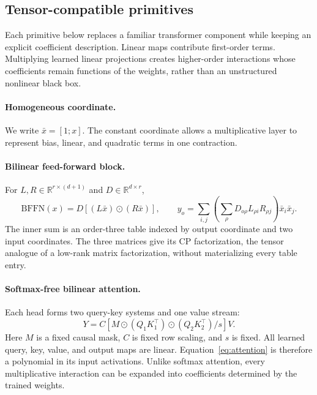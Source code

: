 \documentclass{article}
\newcommand{\R}{\mathbb{R}}
\begin{document}
\subsection{Tensor-compatible primitives}

Each primitive below replaces a familiar transformer component while keeping an explicit
coefficient description. Linear maps contribute first-order terms. Multiplying learned linear
projections creates higher-order interactions whose coefficients remain functions of the
weights, rather than an unstructured nonlinear black box.

\paragraph{Homogeneous coordinate.}
We write $\bar x=[1;x]$. The constant coordinate allows a multiplicative layer to represent
bias, linear, and quadratic terms in one contraction.

\paragraph{Bilinear feed-forward block.}
For $L,R\in\R^{r\times(d+1)}$ and $D\in\R^{d\times r}$,
\begin{equation}
\mathrm{BFFN}(x)
=D\left[(L\bar x)\odot(R\bar x)\right],
\qquad
y_o=\sum_{i,j}\left(\sum_{\rho}D_{o\rho}L_{\rho i}R_{\rho j}\right)\bar x_i\bar x_j .
\label{eq:bffn}
\end{equation}
The inner sum is an order-three table indexed by output coordinate and two input coordinates.
The three matrices give its CP factorization, the tensor analogue of a low-rank matrix
factorization, without materializing every table entry.

\paragraph{Softmax-free bilinear attention.}
Each head forms two query-key systems and one value stream:
\begin{equation}
Y=C\left[M\odot(Q_1K_1^\top)\odot(Q_2K_2^\top)/s\right]V .
\label{eq:attention}
\end{equation}
Here $M$ is a fixed causal mask, $C$ is fixed row scaling, and $s$ is fixed. All learned
query, key, value, and output maps are linear. Equation~\ref{eq:attention} is therefore a
polynomial in its input activations. Unlike softmax attention, every multiplicative interaction
can be expanded into coefficients determined by the trained weights.
\end{document}
